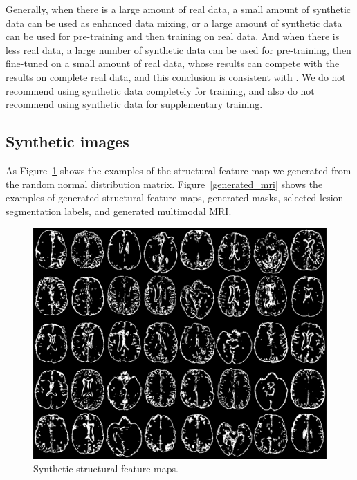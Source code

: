 \documentclass[letterpaper]{article} %
\begin{document}
Generally, when there is a large amount of real data, a small amount of synthetic data can be used as enhanced data mixing, or a large amount of synthetic data can be used for pre-training and then training on real data. And when there is less real data, a large number of synthetic data can be used for pre-training, then fine-tuned on a small amount of real data, whose results can compete with the results on complete real data, and this conclusion is consistent with \cite{4shin2018medical}. We do not recommend using synthetic data completely for training, and also do not recommend using synthetic data for supplementary training.

\subsection{Synthetic images}
As Figure~\ref{generated_f} shows the examples of the structural feature map we generated from the random normal distribution matrix. Figure~\ref{generated_mri} shows the examples of generated structural feature maps, generated masks, selected lesion segmentation labels, and generated multimodal MRI.
\begin{figure}
	\centering
	\includegraphics[width=0.7\linewidth]{figures/Fs}
	\caption{Synthetic structural feature maps.}
	\label{generated_f}
\end{figure}
\end{document}
